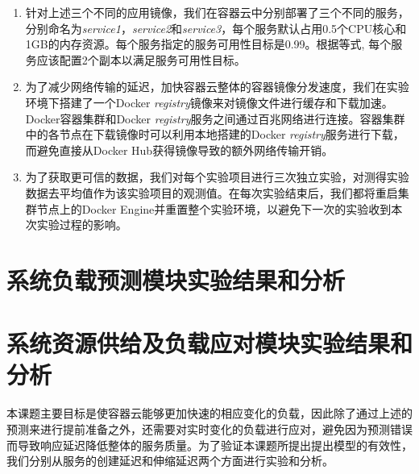 \begin{enumerate}
\item\label{req:serv_aval} 针对上述三个不同的应用镜像，我们在容器云中分别部署了三个不同的服务，分别命名为\emph{service1}，\emph{service2}和\emph{service3}，每个服务默认占用0.5个CPU核心和1GB的内存资源。每个服务指定的服务可用性目标是0.99。根据等式, 每个服务应该配置2个副本以满足服务可用性目标。

\item\label{req:registry_mirror} 为了减少网络传输的延迟，加快容器云整体的容器镜像分发速度，我们在实验环境下搭建了一个Docker \emph{registry}镜像来对镜像文件进行缓存和下载加速。Docker容器集群和Docker \emph{registry}服务之间通过百兆网络进行连接。容器集群中的各节点在下载镜像时可以利用本地搭建的Docker \emph{registry}服务进行下载，而避免直接从Docker Hub获得镜像导致的额外网络传输开销。

\item 为了获取更可信的数据，我们对每个实验项目进行三次独立实验，对测得实验数据去平均值作为该实验项目的观测值。在每次实验结束后，我们都将重启集群节点上的Docker Engine并重置整个实验环境，以避免下一次的实验收到本次实验过程的影响。
\end{enumerate}

\section{系统负载预测模块实验结果和分析}

\section{系统资源供给及负载应对模块实验结果和分析}
本课题主要目标是使容器云能够更加快速的相应变化的负载，因此除了通过上述的预测来进行提前准备之外，还需要对实时变化的负载进行应对，避免因为预测错误而导致响应延迟降低整体的服务质量。为了验证本课题所提出提出模型的有效性，我们分别从服务的创建延迟和伸缩延迟两个方面进行实验和分析。

